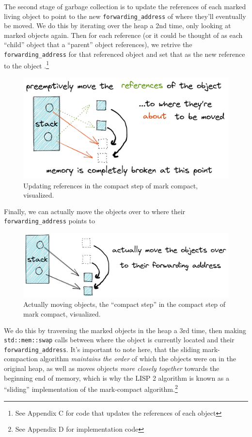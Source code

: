 \documentclass[index]{subfiles}
\begin{document}
The second stage of garbage collection is to update the references of each marked living object to point to the new \verb+forwarding_address+ of where they'll eventually be moved. We do this by iterating over the heap a 2nd time, only looking at marked objects again. Then for each reference (or it could be thought of as each ``child'' object that a ``parent'' object references), we retrive the \verb+forwarding_address+ for that referenced object and set that as the new reference to the object \cites[Chapter 3]{gc_handbook}[Sec.~3.4]{redhat_openjdk}.\footnote{See Appendix C for code that updates the references of each object}

\begin{figure}[H]
    \centering
    \includegraphics[scale=0.3]{pics/update-references.png}
    \caption{Updating references in the compact step of mark compact, visualized.}
\end{figure}

Finally, we can actually move the objects over to where their \verb+forwarding_address+ points to

\begin{figure}[H]
    \centering
    \includegraphics[scale=0.25]{pics/actually-move.png}
    \caption{Actually moving objects, the ``compact step'' in the compact step of mark compact, visualized.}
\end{figure}

We do this by traversing the marked objects in the heap a 3rd time, then making \texttt{std::mem::swap} calls between where the object is currently located and their \verb+forwarding_address+. It's important to note here, that the sliding mark-compaction algorithm \textit{maintains the order} of which the objects were on in the original heap, as well as moves objects \textit{more closely together} towards the beginning end of memory, which is why the LISP 2 algorithm is known as a ``sliding'' implementation of the mark-compact algorithm.\footnote{See Appendix D for implementation code}
\end{document}
